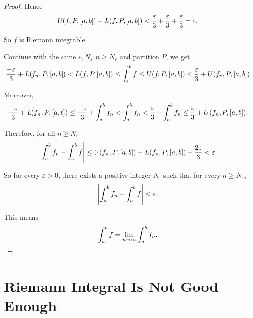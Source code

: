 \begin{proof}
    Hence
    \[
        U(f, P, \left[{a, b}\right]) - L(f, P, \left[{a, b}\right]) < \frac{\varepsilon}{3} + \frac{\varepsilon}{3} + \frac{\varepsilon}{3} = \varepsilon.
    \]

    So $f$ is Riemann integrable.

    Continue with the same $\varepsilon, N_{\varepsilon}, n\geq N_{\varepsilon}$ and partition $P$, we get
    \[
        \frac{-\varepsilon}{3} + L(f_{n}, P, \left[{a, b}\right]) < L(f, P, \left[{a, b}\right]) \leq \int^{b}_{a}f \leq U(f, P, \left[{a, b}\right]) < \frac{\varepsilon}{3} + U(f_{n}, P, \left[{a, b}\right])
    \]

    Moreover,
    \[
        \frac{-\varepsilon}{3} + L(f_{n}, P, \left[{a, b}\right]) \leq \frac{-\varepsilon}{3} + \int^{b}_{a}f_{n} < \int^{b}_{a}f_{n} < \frac{\varepsilon}{3} + \int^{b}_{a}f_{n} \leq \frac{\varepsilon}{3} + U(f_{n}, P, \left[{a, b}\right]).
    \]

    Therefore, for all $n\geq N_{\varepsilon}$
    \[
        \left\vert{\int^{b}_{a}f_{n} - \int^{b}_{a}f}\right\vert \leq U(f_{n}, P, \left[{a, b}\right]) - L(f_{n}, P, \left[{a, b}\right]) + \frac{2\varepsilon}{3} < \varepsilon.
    \]

    So for every $\varepsilon > 0$, there exists a positive integer $N_{\varepsilon}$ such that for every $n\geq N_{\varepsilon}$,
    \[
        \left\vert{\int^{b}_{a}f_{n} - \int^{b}_{a}f}\right\vert < \varepsilon.
    \]

    This means
    \[
        \int^{b}_{a}f = \lim\limits_{n\to\infty}\int^{b}_{a}f_{n}.\qedhere
    \]
\end{proof}
\newpage

\section{Riemann Integral Is Not Good Enough}
